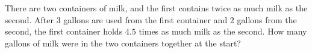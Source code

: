 There are two containers of milk, and the first contains twice as much milk as the second. After $3$ gallons are used from the first container and $2$ gallons from the second, the first container holds $4.5$ times as much milk as the second. How many gallons of milk were in the two containers together at the start?
